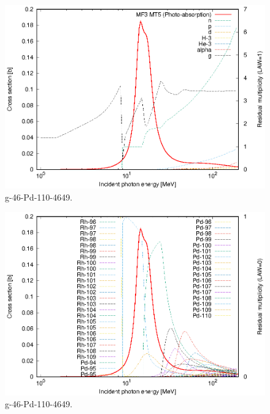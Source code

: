 \begin{figure}
 \includegraphics[width=\linewidth]{eps/g_46-Pd-110_4649.eps}
  \caption{g-46-Pd-110-4649.}
\end{figure}
\begin{figure}
 \includegraphics[width=\linewidth]{eps-law0/g_46-Pd-110_4649.eps}
 \caption{g-46-Pd-110-4649.}
\end{figure}
\newpage \clearpage


